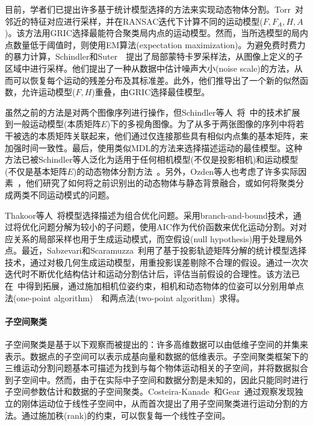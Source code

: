 目前，学者们已提出许多基于统计模型选择的方法来实现动态物体分割。Torr~\cite{faugeras1998geometric}对邻近的特征对应进行采样，并在RANSAC迭代下计算不同的运动模型($F, F_A, H, A$)。该方法用GRIC选择最能符合聚类局内点的运动模型。然而，当所选模型的局内点数量低于阈值时，则使用EM算法(expectation maximization)。为避免费时费力的暴力计算，Schindler和Suter~\cite{schindler2005two}~\cite{schindler2006two}提出了局部蒙特卡罗采样法，从图像上定义的子区域中进行采样。他们提出了一种从数据中估计噪声大小(noise scale)的方法，从而可以恢复每个运动的残差分布及其标准差。此外，他们推导出了一个新的似然函数，允许运动模型($F, H$)重叠，由GRIC选择最佳模型。

虽然之前的方法是对两个图像序列进行操作，但Schindler等人~\cite{schindler2006perspective}将~\cite{schindler2005two}中的技术扩展到一般运动模型(本质矩阵$E$)下的多视角图像。为了从多于两张图像的序列中将若干被选的本质矩阵关联起来，他们通过仅连接那些具有相似内点集的基本矩阵，来加强时间一致性。最后，使用类似MDL的方法来选择描述运动的最佳模型。这种方法已被Schindler等人泛化为适用于任何相机模型(不仅是投影相机)和运动模型(不仅是基本矩阵$E$)的动态物体分割方法~\cite{schindler2008model}。另外，Ozden等人也考虑了许多实际因素~\cite{ozden2010multibody}，他们研究了如何将之前识别出的动态物体与静态背景融合，或如何将聚类分成两类不同运动模式的问题。

Thakoor等人~\cite{thakoor2010multibody}将模型选择描述为组合优化问题。采用branch-and-bound技术，通过将优化问题分解为较小的子问题，使用AIC作为代价函数来优化运动分割。对对应关系的局部采样也用于生成运动模式，而空假设(null hypothesis)用于处理局外点。最近，Sabzevari和Scaramuzza~\cite{sabzevari2014monocular}利用了基于投影轨迹矩阵分解的统计模型选择技术，通过对极几何生成运动模型，用重投影误差剔除不合理的假设。通过一次次迭代时不断优化结构估计和运动分割估计后，评估当前假设的合理性。该方法已在~\cite{sabzevari2016multi}中得到拓展，通过施加相机位姿约束，相机和动态物体的位姿可以分别用单点法(one-point algorithm)~\cite{scaramuzza20111}~\cite{scaramuzza2009real}和两点法(two-point algorithm)~\cite{ortin2001indoor}求得。


\paragraph{子空间聚类}
子空间聚类是基于以下观察而被提出的：许多高维数据可以由低维子空间的并集来表示。数据点的子空间可以表示成基向量和数据的低维表示。子空间聚类框架下的三维运动分割问题基本可描述为找到与每个物体运动相关的子空间，并将数据拟合到子空间中。然而，由于在实际中子空间和数据分割是未知的，因此只能同时进行子空间参数估计和数据的子空间聚类。Costeira-Kanade~\cite{costeira1998multibody}和Gear~\cite{gear1998multibody}通过观察发现独立的刚体运动位于线性子空间中，从而首次提出了用子空间聚类进行运动分割的方法。通过施加秩(rank)的约束，可以恢复每一个线性子空间。

